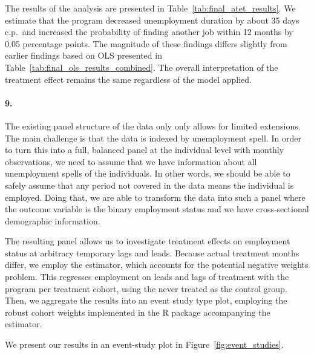 \documentclass{scrartcl}
\begin{document}
The results of the analysis are presented in Table~\ref{tab:final_atet_results}. We estimate that the program decreased unemployment duration by about 35 days c.p.\ and increased the probability of finding another job within 12 months by 0.05 percentage points. The magnitude of these findings differs slightly from earlier findings based on OLS presented in Table~\ref{tab:final_ols_results_combined}. The overall interpretation of the treatment effect remains the same regardless of the model applied.



\paragraph*{9.}

The existing panel structure of the data only only allows for limited extensions. The main challenge is that the data is indexed by unemployment spell. In order to turn this into a full, balanced panel at the individual level with monthly observations, we need to assume that we have information about all unemployment spells of the individuals. In other words, we should be able to safely assume that any period not covered in the data means the individual is employed. Doing that, we are able to transform the data into such a panel where the outcome variable is the binary employment status and we have cross-sectional demographic information.

The resulting panel allows us to investigate treatment effects on employment status at arbitrary temporary lags and leads. Because actual treatment months differ, we employ the \cite{callawayDifferenceinDifferencesMultipleTime2020} estimator, which accounts for the potential negative weights problem. This regresses employment on leads and lags of treatment with the program per treatment cohort, using the never treated as the control group. Then, we aggregate the results into an event study type plot, employing the robust cohort weights implemented in the R package accompanying the estimator. 

We present our results in an event-study plot in Figure~\ref{fig:event_studies}. 
\end{document}
